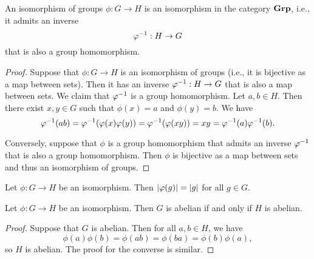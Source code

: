 \begin{theorem}
    An isomorphism of groups \(\phi: G \to H\) is an isomorphism in the category
    \(\mathbf{Grp}\), i.e., it admits an inverse
    \[
        \varphi^{-1} : H \to G
    \]
    that is also a group homomorphism.
\end{theorem}

\begin{proof}
    Suppose that \(\phi: G \to H\) is an isomorphism of groups (i.e., it is
    bijective as a map between sets). Then it has an inverse \(\varphi^{-1} : H \to
    G\) that is also a map between sets. We claim that \(\varphi^{-1}\) is a group
    homomorphism. Let \(a, b \in H\). Then there exist \(x, y \in G\) such that
    \(\phi(x) = a\) and \(\phi(y) = b\). We have
    \[
        \varphi^{-1}(ab) = \varphi^{-1}(\varphi(x)\varphi(y)) = \varphi^{-1}(\varphi(xy)) = xy = \varphi^{-1}(a)\varphi^{-1}(b).
    \]
    
    Conversely, suppose that \(\phi\) is a group homomorphism that admits an
    inverse \(\varphi^{-1}\) that is also a group homomorphism. Then \(\phi\) is
    bijective as a map between sets and thus an isomorphism of groups.
\end{proof}


\begin{theorem}
    Let \(\phi: G \to H\) be an isomorphism. Then \(\lvert \varphi(g) \rvert =
    \lvert g \rvert\) for all \(g \in G\).
\end{theorem}

\begin{theorem}
    Let \(\phi : G \to H\) be an isomorphism. Then \(G\) is abelian if and only
    if \(H\) is abelian.
\end{theorem}

\begin{proof}
    Suppose that \(G\) is abelian. Then for all \(a, b \in H\), we have
    \[
        \phi(a)\phi(b) = \phi(ab) = \phi(ba) = \phi(b)\phi(a),
    \]
    so \(H\) is abelian. The proof for the converse is similar.
\end{proof}



\bigskip

